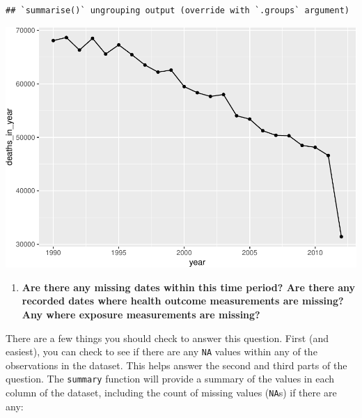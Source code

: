 \documentclass[
]{book}
\newenvironment{Shaded}{\begin{snugshade}}{\end{snugshade}}
\newcommand{\DataTypeTok}[1]{\textcolor[rgb]{0.13,0.29,0.53}{#1}}
\newcommand{\KeywordTok}[1]{\textcolor[rgb]{0.13,0.29,0.53}{\textbf{#1}}}
\newcommand{\NormalTok}[1]{#1}
\newcommand{\OperatorTok}[1]{\textcolor[rgb]{0.81,0.36,0.00}{\textbf{#1}}}
\newcommand{\StringTok}[1]{\textcolor[rgb]{0.31,0.60,0.02}{#1}}
\providecommand{\tightlist}{%
  \setlength{\itemsep}{0pt}\setlength{\parskip}{0pt}}
\begin{document}
\begin{Shaded}
\end{Shaded}

\begin{verbatim}
## `summarise()` ungrouping output (override with `.groups` argument)
\end{verbatim}

\includegraphics{adv_epi_analysis_files/figure-latex/unnamed-chunk-7-1.pdf}

\begin{enumerate}
\def\labelenumi{\arabic{enumi}.}
\setcounter{enumi}{1}
\tightlist
\item
  \textbf{Are there any missing dates within this time period? Are there any recorded
  dates where health outcome measurements are missing?
  Any where exposure measurements are missing?}
\end{enumerate}

There are a few things you should check to answer this question. First
(and easiest), you can check to see if there are any \texttt{NA} values within
any of the observations in the dataset. This helps answer the second and third
parts of the question. The \texttt{summary} function will provide
a summary of the values in each column of the dataset, including the count
of missing values (\texttt{NA}s) if there are any:
\end{document}
